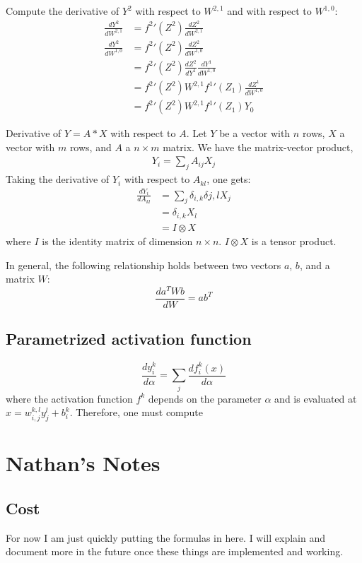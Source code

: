 \documentclass{article}
\begin{document}
Compute the derivative of $Y^2$ with respect to $W^{2,1}$ and with respect to $W^{1,0}$: 
\begin{align}
\frac{dY^2}{dW^{2,1}} &= {f^2}'(Z^2) \frac{dZ^2}{dW^{2,1}} \\
\frac{dY^2}{dW^{1,0}} &= {f^2}'(Z^2) \frac{dZ^2}{dW^{1,0}} \\
                      &= {f^2}'(Z^2) \frac{dZ^2}{dY^{1}} \frac{dY^{1}}{dW^{1,0}} \\
                      &= {f^2}'(Z^2) W^{2,1} {f^1}'(Z_1)\frac{dZ^1}{dW^{1,0}} \\     %
                      &= {f^2}'(Z^2) W^{2,1} {f^1}'(Z_1) Y_0     
\end{align}

Derivative of $Y=A*X$ with respect to $A$. Let $Y$ be a vector with $n$ rows, $X$ a vector with $m$ rows, and $A$ a $n\times m$ matrix. 
We have the matrix-vector product, 
\begin{align}
Y_i = \sum_j A_{ij} X_j
\end{align}
Taking the derivative of $Y_i$ with respect to $A_{kl}$, one gets: 
\begin{align}
\frac{dY_i}{dA_{kl}} &= \sum_j \delta_{i,k}\delta{j,l} X_j \\
                     &=   \delta_{i,k} X_l \\
                     &=   I \otimes X 
\end{align}
where $I$ is the identity matrix of dimension $n\times n$. $I\otimes X$ is a tensor product. 

In general, the following relationship holds between two vectors $a$, $b$, and a matrix $W$: 
$$
\frac{da^TWb}{dW} = a b^T
$$

\subsection{Parametrized activation function}
$$
\frac{dy^k_i}{d\alpha}
   = \sum_{j} \frac{df_i^k(x)}{d\alpha} 
$$
where the activation function $f^k$ depends on the parameter $\alpha$ and is evaluated at 
$x=w^{k,l}_{i,j} y^l_j + b^k_i$. 
Therefore, one must compute 


\section{Nathan's Notes}

\subsection{Cost}
For now I am just quickly putting the formulas in here. I will explain and document more in the future once these things are implemented and working.
\end{document}
